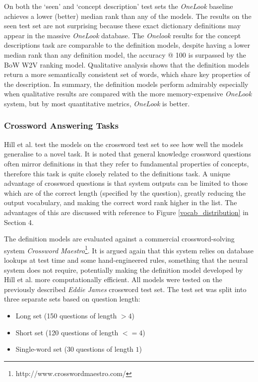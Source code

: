 \documentclass[11pt]{article}
\begin{document}
\begin{spacing}{1}
On both the `seen' and `concept description' test sets the \textit{OneLook} baseline achieves a lower (better) median rank than any of the models. The results on the seen test set are not surprising because these exact dictionary definitions may appear in the massive \textit{OneLook} database. The \textit{Onelook} results for the concept descriptions task are comparable to the definition models, despite having a lower median rank than any definition model, the accuracy @ 100 is surpassed by the BoW W2V ranking model. Qualitative analysis shows that the definition models return a more semantically consistent set of words, which share key properties of the description. In summary, the definition models perform admirably especially when qualitative results are compared with the more memory-expensive \textit{OneLook} system, but by most quantitative metrics, \textit{OneLook} is better.

\subsubsection{Crossword Answering Tasks}
Hill et al. \citeyear{hill2015learning} test the models on the crossword test set to see how well the models generalise to a novel task. It is noted that general knowledge crossword questions often mirror definitions in that they refer to fundamental properties of concepts, therefore this task is quite closely related to the definitions task. A unique advantage of crossword questions is that system outputs can be limited to those which are of the correct length (specified by the question), greatly reducing the output vocabulary, and making the correct word rank higher in the list. The advantages of this are discussed with reference to Figure \ref{vocab_distribution} in Section 4.

The definition models are evaluated against a commercial crossword-solving system \textit{Crossword Maestro}\footnote{http://www.crosswordmaestro.com/}. It is argued again that this system relies on database lookups at test time and some hand-engineered rules, something that the neural system does not require, potentially making the definition model developed by Hill et al. \citeyear{hill2015learning} more computationally efficient. All models were tested on the previously described \textit{Eddie James} crossword test set. The test set was split into three separate sets based on question length: 

\begin{itemize}
\item Long set (150 questions of length $>4$)
\item Short set (120 questions of length $<= 4$)
\item Single-word set (30 questions of length $1$)
\end{itemize}


\end{spacing}
\end{document}
